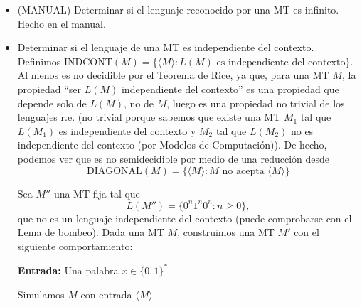 \begin{ejercicio}
\begin{itemize}
\begin{algorithm}
\begin{algorithmic}
                \State \hspace{3cm} $F(M)$ acepta.

                \State \hspace{2cm} \textbf{Si no} \textbf{entonces}

                \State \hspace{3cm} $F(M)$ rechaza.
            \end{algorithmic}
        \end{algorithm}

        \item[c)] (MANUAL) Determinar si el lenguaje reconocido por una MT es infinito. \\
        
        Hecho en el manual.

        \item[d)] Determinar si el lenguaje de una MT es independiente del contexto. \\
        
        Definimos $\text{INDCONT}(M) = \{\langle M \rangle : L(M) \text{ es independiente del contexto}\}$. Al menos es no 
        decidible por el Teorema de Rice, ya que, para una MT $M$, la propiedad ``ser $L(M)$ 
        independiente del contexto'' es una propiedad que depende solo de $L(M)$, no de $M$, luego es una propiedad
        no trivial de los lenguajes r.e. (no trivial porque sabemos que existe una MT $M_1$ tal que $L(M_1)$ es independiente 
        del contexto y $M_2$ tal que $L(M_2)$ no es independiente del contexto (por Modelos de Computación)). De hecho, podemos ver 
        que es no semidecidible por medio de una reducción desde
        $$\text{DIAGONAL}(M) = \{\langle M \rangle : M \text{ no acepta } \langle M \rangle \}$$

        Sea $M''$ una MT fija tal que
        $$
        L(M'')=\{0^n1^n0^n : n\geq 0\},
        $$
        que no es un lenguaje independiente del contexto (puede comprobarse con el Lema de bombeo). Dada una MT $M$, construimos una MT $M'$ con el siguiente comportamiento:

        \begin{algorithm}
            \caption{MT $M'$}
            \label{algorithm:reduccion-diagonal-indcont}
            \begin{algorithmic}
                \State \textbf{Entrada:} Una palabra $x \in \{0,1\}^{*}$

                \State Simulamos $M$ con entrada $\langle M\rangle$.


\end{algorithmic}
\end{algorithm}
\end{itemize}
\end{ejercicio}
